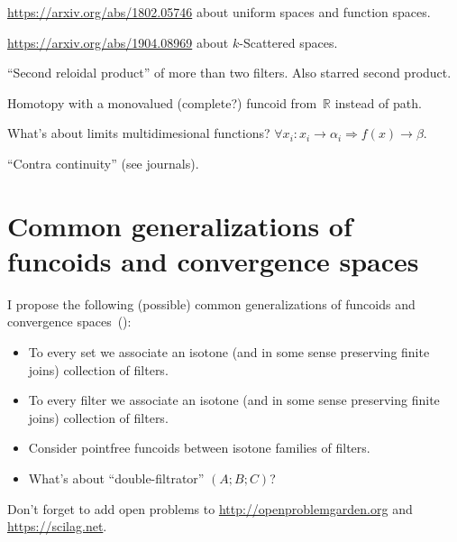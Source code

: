 \documentclass{amsart}
\begin{document}
\url{https://arxiv.org/abs/1802.05746} about uniform spaces and
function spaces.

\url{https://arxiv.org/abs/1904.08969} about $k$-Scattered spaces.

``Second reloidal product'' of more than two filters.
Also starred second product.

Homotopy with a monovalued (complete?) funcoid from~$\mathbb{R}$
instead of path.

What's about limits multidimesional functions? $\forall x_i : x_i \rightarrow
\alpha_i \Rightarrow f (x) \rightarrow \beta$.

``Contra continuity'' (see journals).

\section{Common generalizations of funcoids and convergence spaces}

I propose the following (possible) common generalizations of funcoids and convergence spaces~(\cite{converg}):

\begin{itemize}
\item To every set we associate an isotone (and in some sense preserving finite joins) collection of filters.
\item To every filter we associate an isotone (and in some sense preserving finite joins) collection of filters.
\item Consider pointfree funcoids between isotone families of filters.
\item What's about ``double-filtrator'' $(A;B;C)$?
\end{itemize}

Don't forget to add open problems to
\url{http://openproblemgarden.org} and
\url{https://scilag.net}.



\end{document}
